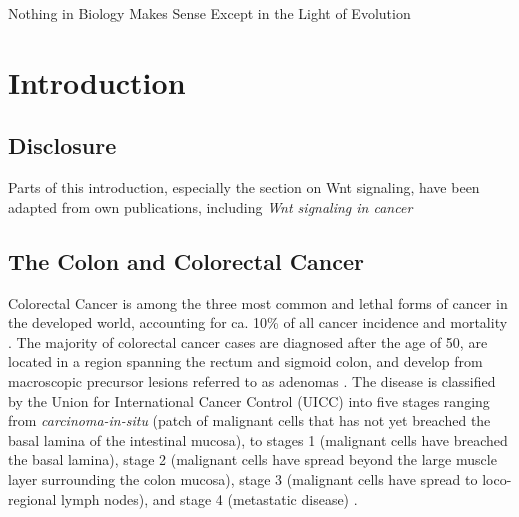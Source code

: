 \begin{savequote}[75mm]
Nothing in Biology Makes Sense Except in the Light of Evolution
\end{savequote}

\chapter{Introduction}
\label{introduction}
\begin{flushleft}
\setlength{\parindent}{7ex}
\section{Disclosure}
Parts of this introduction, especially the section on Wnt signaling, have been adapted from own publications, including \textit{Wnt signaling in cancer} \cite{Zhan2017}

\section{The Colon and Colorectal Cancer}

Colorectal Cancer is among the three most common and lethal forms of cancer in the developed world, accounting for ca. 10\% of all cancer incidence and mortality \cite{sungGlobalCancerStatistics2021}. The majority of colorectal cancer cases are diagnosed after the age of 50, are located in a region spanning the rectum and sigmoid colon, and develop from macroscopic precursor lesions referred to as adenomas \cite{Cho1992}. The disease is classified by the Union for International Cancer Control (UICC) into five stages ranging from \textit{carcinoma-in-situ} (patch of malignant cells that has not yet breached the basal lamina of the intestinal mucosa), to stages 1 (malignant cells have breached the basal lamina), stage 2 (malignant cells have spread beyond the large muscle layer surrounding the colon mucosa), stage 3 (malignant cells have spread to loco-regional lymph nodes), and stage 4 (metastatic disease) \cite{ColorectalCancerStages2012}.\par


\end{flushleft}
